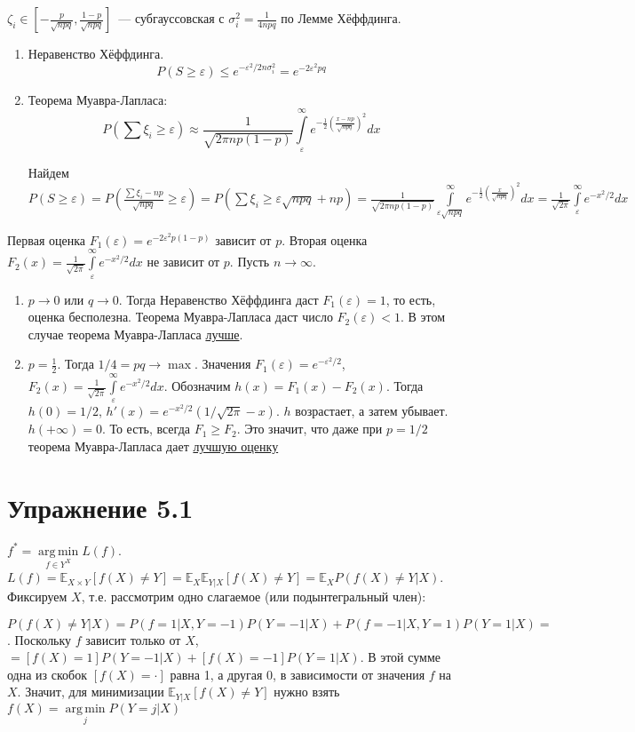 \documentclass[a4paper]{article}
\DeclareMathOperator*{\argmin}{arg\,min}
\def\eps{\varepsilon}
\begin{document}
$\zeta_i\in[-\frac{p}{\sqrt{npq}},\frac{1-p}{\sqrt{npq}}]$~--- субгауссовская с $\sigma^2_i=\frac{1}{4npq}$ по Лемме Хёффдинга.
\begin{enumerate}
\item Неравенство Хёффдинга. 
$$P(S\geqslant\eps)\leqslant e^{-\eps^2/2n\sigma_i^2}=e^{-2\eps^2pq}$$
\item Теорема Муавра-Лапласа: $$P(\sum\xi_i\geqslant\eps)\approx \frac{1}{\sqrt{2\pi np(1-p)}}\int\limits_\eps^\infty e^{-\frac{1}{2}\left(\frac{x-np}{\sqrt{npq}}\right)^2}dx$$

Найдем $P(S\geqslant \eps)=P(\frac{\sum\xi_i-np}{\sqrt{npq}}\geqslant\eps)=P(\sum\xi_i\geqslant\eps\sqrt{npq}+np)=\frac{1}{\sqrt{2\pi np(1-p)}}\int\limits_{\eps\sqrt{npq}}^\infty e^{-\frac{1}{2}\left(\frac{x}{\sqrt{npq}}\right)^2}dx=\frac{1}{\sqrt{2\pi}}\int\limits_\eps^\infty e^{-x^2/2}dx$
\end{enumerate}
Первая оценка $F_1(\eps)=e^{-2\eps^2p(1-p)}$ зависит от $p$.
Вторая оценка $F_2(x)=\frac{1}{\sqrt{2\pi}}\int\limits_\eps^\infty e^{-x^2/2}dx$ не зависит от $p$. Пусть $n\to\infty$.
\begin{enumerate}
\item $p\to 0$ или $q\to 0$. Тогда Неравенство Хёффдинга даст $F_1(\eps)=1$, то есть, оценка бесполезна. Теорема Муавра-Лапласа даст число $F_2(\eps)<1$. В этом случае теорема Муавра-Лапласа \underline{лучше}.
\item $p=\frac{1}{2}$. Тогда $1/4=pq\to\max$. Значения $F_1(\eps)=e^{-\eps^2/2}$, $F_2(x)=\frac{1}{\sqrt{2\pi}}\int\limits_\eps^\infty e^{-x^2/2}dx$. Обозначим $h(x)=F_1(x)-F_2(x)$. Тогда $h(0)=1/2$, $h'(x)=e^{-x^2/2}(1/\sqrt{2\pi}-x)$. $h$ возрастает, а затем убывает. $h(+\infty)=0$. То есть, всегда $F_1\geqslant F_2$. Это значит, что даже при $p=1/2$ теорема Муавра-Лапласа дает \underline{лучшую оценку} 
\end{enumerate}
\section*{Упражнение 5.1}
$f^*=\argmin\limits_{f\in Y^X} L(f)$. $L(f)=\mathbb{E}_{X\times Y}[f(X)\neq Y]=\mathbb{E}_X\mathbb{E}_{Y|X}[f(X)\neq Y]=\mathbb{E}_X P(f(X)\neq Y\big| X)$. Фиксируем $X$, т.е. рассмотрим одно слагаемое (или подынтегральный член):

$P(f(X)\neq Y\big|X)=P(f=1\big| X,Y=-1)P(Y=-1\big|X)+P(f=-1\big| X,Y=1)P(Y=1\big|X)\boxed{=}$. Поскольку $f$ зависит только от $X$, $\boxed{=}[f(X)=1]P(Y=-1\big|X)+[f(X)=-1]P(Y=1\big|X)$. В этой сумме одна из скобок $[f(X)=\cdot]$ равна 1, а другая 0, в зависимости от значения $f$ на $X$. Значит, для минимизации $\mathbb{E}_{Y|X}[f(X)\neq Y]$ нужно взять $f(X)=\argmin\limits_j P(Y=j\big|X)$
\end{document}

